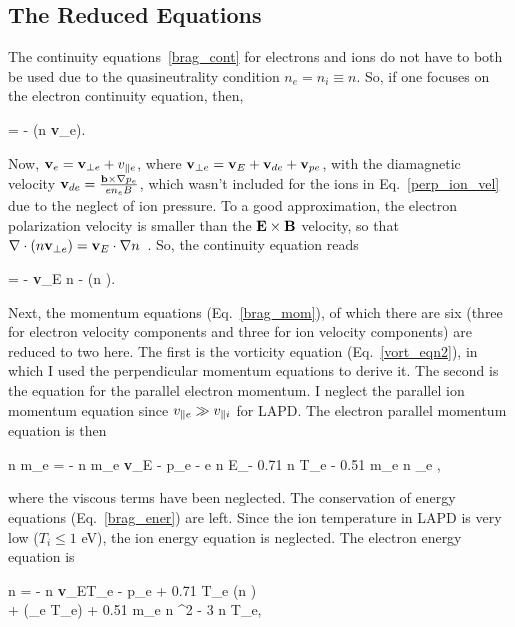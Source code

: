 \subsection{The Reduced Equations}
\label{ss_reduced_eqns}

The continuity equations~\ref{brag_cont} for electrons and ions do not have to both be used due to the quasineutrality condition $n_e = n_i \equiv n$. So, if one focuses on the electron
continuity equation, then,

\beq
\label{cont1}
 = - \grad \cdot (n {\bf v}_e).
\eeq

Now, ${\bf v}_e = {\bf v}_{\perp e} + v_{\parallel e}$, where ${\bf v}_{\perp e} = {\bf v}_{E} + {\bf v}_{d e} + {\bf v}_{p e}$, with the diamagnetic velocity 
${\bf v}_{d e} = \frac{{\bf b} \times \nabla p_e}{e n_e B}$, which wasn't included for the ions in Eq.~\ref{perp_ion_vel} due to the neglect of ion pressure. 
To a good approximation, the electron polarization velocity is smaller than the ${\bf E \times B}$ velocity, so that
$\nabla \cdot (n {\bf v}_{\perp e}) = {\bf v}_{E} \cdot \nabla n$~\cite{Popovich2010a,simakov2003}. So, the continuity equation reads

\beq
\label{cont_eqn}
 = - {\bf v}_{E} \cdot \grad n - \gradpar (n \vpe).
\eeq

Next, the momentum equations (Eq.~\ref{brag_mom}), of which there are six (three for electron velocity components and three for ion velocity components) are reduced to two here. The first is the
vorticity equation (Eq.~\ref{vort_eqn2}), in which I used the perpendicular momentum equations to derive it. The second is the equation for the parallel electron momentum. I neglect the parallel
ion momentum equation since $v_{\parallel e} \gg v_{\parallel i}$ for LAPD. The electron parallel momentum equation is then

\beq
\label{mom_eqn}
n m_e  = - n m_e {\bf v}_E \cdot \grad \vpe - \gradpar p_e - e n E_\para - 0.71 n \gradpar T_e - 0.51 m_e n \nu_e \vpe,
\eeq

where the viscous terms have been neglected. The conservation of energy equations (Eq.~\ref{brag_ener}) are left. Since the ion temperature in LAPD is very low ($T_i \leq 1$ eV), the ion energy
equation is neglected. The electron energy equation is~\cite{simakov2003}

\beqar
\label{elec_ener}
 n  = -  n {\bf v}_E\cdot \grad T_e - p_e \gradpar \vpe + 0.71 T_e \grad \cdot (n \vpe) \\ \nonumber
+ \gradpar (\kappa_{\para e} \gradpar T_e) + 0.51 m_e n \nue \vpe^2 - 3  n \nue T_e,
\eeqar

